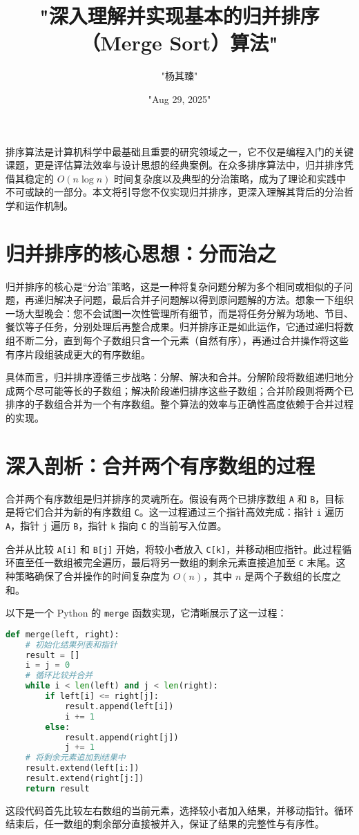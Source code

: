 \title{"深入理解并实现基本的归并排序（Merge Sort）算法"}
\author{"杨其臻"}
\date{"Aug 29, 2025"}
\maketitle
排序算法是计算机科学中最基础且重要的研究领域之一，它不仅是编程入门的关键课题，更是评估算法效率与设计思想的经典案例。在众多排序算法中，归并排序凭借其稳定的 $O(n\log{n})$ 时间复杂度以及典型的分治策略，成为了理论和实践中不可或缺的一部分。本文将引导您不仅实现归并排序，更深入理解其背后的分治哲学和运作机制。\par
\chapter{归并排序的核心思想：分而治之}
归并排序的核心是“分治”策略，这是一种将复杂问题分解为多个相同或相似的子问题，再递归解决子问题，最后合并子问题解以得到原问题解的方法。想象一下组织一场大型晚会：您不会试图一次性管理所有细节，而是将任务分解为场地、节目、餐饮等子任务，分别处理后再整合成果。归并排序正是如此运作，它通过递归将数组不断二分，直到每个子数组只含一个元素（自然有序），再通过合并操作将这些有序片段组装成更大的有序数组。\par
具体而言，归并排序遵循三步战略：分解、解决和合并。分解阶段将数组递归地分成两个尽可能等长的子数组；解决阶段递归排序这些子数组；合并阶段则将两个已排序的子数组合并为一个有序数组。整个算法的效率与正确性高度依赖于合并过程的实现。\par
\chapter{深入剖析：合并两个有序数组的过程}
合并两个有序数组是归并排序的灵魂所在。假设有两个已排序数组 \texttt{A} 和 \texttt{B}，目标是将它们合并为新的有序数组 \texttt{C}。这一过程通过三个指针高效完成：指针 \texttt{i} 遍历 \texttt{A}，指针 \texttt{j} 遍历 \texttt{B}，指针 \texttt{k} 指向 \texttt{C} 的当前写入位置。\par
合并从比较 \texttt{A[i]} 和 \texttt{B[j]} 开始，将较小者放入 \texttt{C[k]}，并移动相应指针。此过程循环直至任一数组被完全遍历，最后将另一数组的剩余元素直接追加至 \texttt{C} 末尾。这种策略确保了合并操作的时间复杂度为 $O(n)$，其中 $n$ 是两个子数组的长度之和。\par
以下是一个 Python 的 \texttt{merge} 函数实现，它清晰展示了这一过程：\par
\begin{lstlisting}[language=python]
def merge(left, right):
    # 初始化结果列表和指针
    result = []
    i = j = 0
    # 循环比较并合并
    while i < len(left) and j < len(right):
        if left[i] <= right[j]:
            result.append(left[i])
            i += 1
        else:
            result.append(right[j])
            j += 1
    # 将剩余元素追加到结果中
    result.extend(left[i:])
    result.extend(right[j:])
    return result
\end{lstlisting}
这段代码首先比较左右数组的当前元素，选择较小者加入结果，并移动指针。循环结束后，任一数组的剩余部分直接被并入，保证了结果的完整性与有序性。\par
